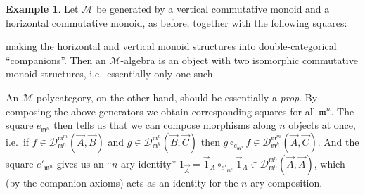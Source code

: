 \documentclass{article}
\theoremstyle{definition}
\newtheorem{eg}[thm]{Example}
\theoremstyle{remark}
\def\M{\mathcal{M}}
\def\mult{\mathfrak{m}}
\def\DD#1#2{\mathcal{D}^{#1}_{#2}}
\def\twocell#1#2#3{\ar[from=#1,to=#2,phantom,""{name=1,near start},""{name=2,near end}]\ar[Rightarrow,from=1,to=2,"#3"]}
\def\drtwocell{\twocell{r}{d}}
\begin{document}
\begin{eg}\label{eg:prop}
  Let $\M$ be generated by a vertical commutative monoid and a horizontal commutative monoid, as before, together with the following squares:
  making the horizontal and vertical monoid structures into double-categorical ``companions''.
  Then an $\M$-algebra is an object with two isomorphic commutative monoid structures, i.e.\ essentially only one such.

  An $\M$-polycategory, on the other hand, should be essentially a \emph{prop}.
  By composing the above generators we obtain corresponding squares for all $\mult^n$.
  The square $e_{\mult^n}$ then tells us that we can compose morphisms along $n$ objects at once, i.e.\ if $f\in\DD{\mult^m}{\mult^n}(\vec{A},\vec{B})$ and $g\in \DD{\mult^n}{\mult^k}(\vec{B},\vec{C})$ then $g\circ_{e_{\mult^n}} f \in \DD{\mult^m}{\mult^k}(\vec{A},\vec{C})$.
  And the square $e'_{\mult^n}$ gives us an ``$n$-ary identity'' $1_{\vec{A}} = \vec{1}_A \circ_{e'_{\mult^n}} \vec{1}_A\in\DD{\mult^n}{\mult^n}(\vec{A},\vec{A})$, which (by the companion axioms) acts as an identity for the $n$-ary composition.
\end{eg}
\end{document}
